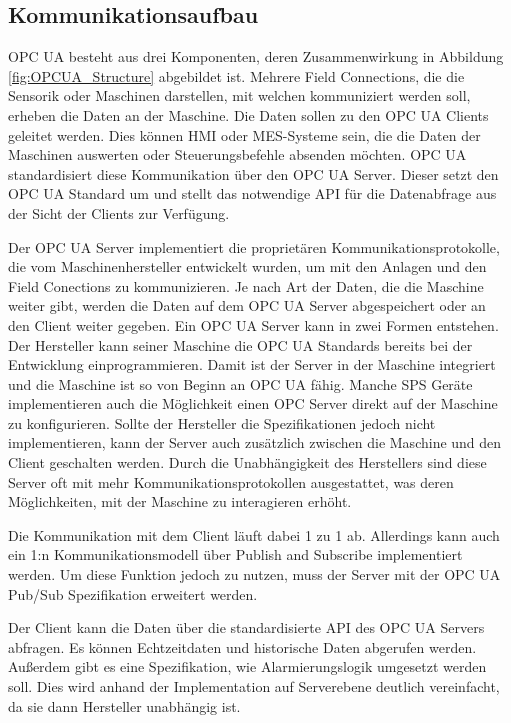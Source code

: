 \documentclass[a4paper, 12pt, oneside, toc=listofnumbered, bibliography=totoc]{scrbook}
\begin{document}
		\subsection{Kommunikationsaufbau} 
		
		OPC UA besteht aus drei Komponenten, deren Zusammenwirkung in Abbildung \ref{fig:OPCUA_Structure} abgebildet ist. Mehrere Field Connections, die die Sensorik oder Maschinen darstellen, mit welchen kommuniziert werden soll, erheben die Daten an der Maschine. Die Daten sollen zu den OPC UA Clients geleitet werden. Dies können \ac{HMI} oder MES-Systeme sein, die die Daten der Maschinen auswerten oder Steuerungsbefehle absenden möchten. OPC UA standardisiert diese Kommunikation über den OPC UA Server. Dieser setzt den OPC UA Standard um und stellt das notwendige \ac{API} für die Datenabfrage aus der Sicht der Clients zur Verfügung. \cite{rinke_was_2022}
		
		Der OPC UA Server implementiert die proprietären Kommunikationsprotokolle, die vom Maschinenhersteller entwickelt wurden, um mit den Anlagen und den Field Conections zu kommunizieren. Je nach Art der Daten, die die Maschine weiter gibt, werden die Daten auf dem OPC UA Server abgespeichert oder an den Client weiter gegeben. Ein OPC UA Server kann in zwei Formen entstehen. Der Hersteller kann seiner Maschine die OPC UA Standards bereits bei der Entwicklung einprogrammieren. Damit ist der Server in der Maschine integriert und die Maschine ist so von Beginn an OPC UA fähig. Manche SPS Geräte implementieren auch die Möglichkeit einen OPC Server direkt auf der Maschine zu konfigurieren. Sollte der Hersteller die Spezifikationen jedoch nicht implementieren, kann der Server auch zusätzlich zwischen die Maschine und den Client geschalten werden. Durch die Unabhängigkeit des Herstellers sind diese Server oft mit mehr Kommunikationsprotokollen ausgestattet, was deren Möglichkeiten, mit der Maschine zu interagieren erhöht. \cite{rinke_was_2022}
		
		Die Kommunikation mit dem Client läuft dabei 1 zu 1 ab. Allerdings kann auch ein 1:n Kommunikationsmodell über Publish and Subscribe implementiert werden. Um diese Funktion jedoch zu nutzen, muss der Server mit der OPC UA Pub/Sub Spezifikation erweitert werden. \cite{mielebacher_verteilte_2021}
		
		Der Client kann die Daten über die standardisierte API des OPC UA Servers abfragen. Es können Echtzeitdaten und historische Daten abgerufen werden. Außerdem gibt es eine Spezifikation, wie Alarmierungslogik umgesetzt werden soll. Dies wird anhand der Implementation auf Serverebene deutlich vereinfacht, da sie dann Hersteller unabhängig ist. \cite{rinke_was_2022}
		
\end{document}

